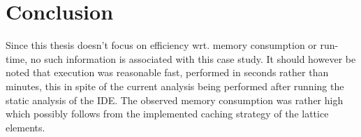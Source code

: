 \section{Conclusion}




Since this thesis doesn't focus on efficiency wrt. memory consumption or run-time, no such information is associated with this case study. It should however be noted that execution was reasonable fast, performed in seconds rather than minutes, this in spite of the current analysis being performed after running the static analysis of the IDE. The observed memory consumption was rather high which possibly follows from the implemented caching strategy of the lattice elements.  